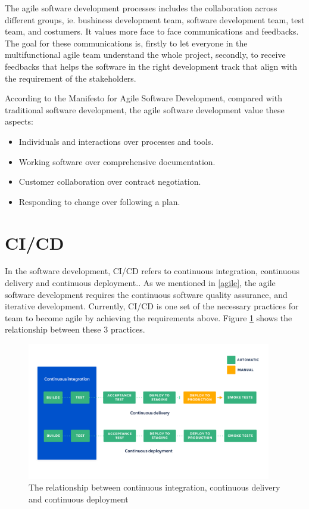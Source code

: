 \par
The agile software development processes includes the collaboration across different groups, ie. bushiness development team, software development team, test team, and costumers. It values more face to face communications\cite{beck2001principles} and feedbacks. The goal for these communications is, firstly to let everyone in the multifunctional agile team understand the whole project, secondly, to receive feedbacks that helps the software in the right development track that align with the requirement of the stakeholders. \cite{beck2001manifesto} 
\par
According to the Manifesto for Agile Software Development, compared with traditional software development, the agile software development value these aspects: \cite{beck2001manifesto}
\begin{itemize}
\item Individuals and interactions over processes and tools.
\item Working software over comprehensive documentation.
\item Customer collaboration over contract negotiation.
\item Responding to change over following a plan.
\end{itemize}
\section{CI/CD}
In the software development, CI/CD refers to continuous integration, continuous delivery and continuous deployment.\cite{Continuo67:online}. As we mentioned in \ref{agile}, the agile software development requires the continuous software quality assurance, and iterative development. Currently, CI/CD is one set of the necessary practices for team to become agile by achieving the requirements above. Figure \ref{fig:cicd} shows the relationship between these 3 practices.
\begin{figure}[h]
    \centering
    \includegraphics[width=0.95\textwidth]{pics/cicd.png}
    \caption{The relationship between continuous integration, continuous delivery and continuous deployment}
    \label{fig:cicd}
\end{figure}
